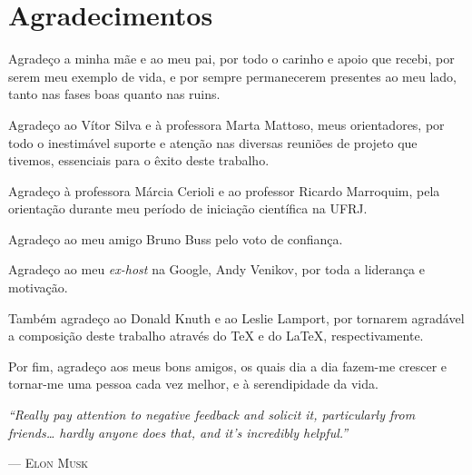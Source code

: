 
\dedication{Dedico este trabalho aos meus pais.}

\chapter*{Agradecimentos}

Agradeço a minha mãe e ao meu pai, por todo o carinho e apoio que recebi, por serem meu exemplo de vida, e por sempre permanecerem presentes ao meu lado, tanto nas fases boas quanto nas ruins.

Agradeço ao Vítor Silva e à professora Marta Mattoso, meus orientadores, por todo o inestimável suporte e atenção nas diversas reuniões de projeto que tivemos, essenciais para o êxito deste trabalho.

Agradeço à professora Márcia Cerioli e ao professor Ricardo Marroquim, pela orientação durante meu período de iniciação científica na UFRJ.

Agradeço ao meu amigo Bruno Buss pelo voto de confiança.

Agradeço ao meu \textit{ex-host} na Google, Andy Venikov, por toda a liderança e motivação.

Também agradeço ao Donald Knuth e ao Leslie Lamport, por tornarem agradável a composição deste trabalho através do \TeX{} e do \LaTeX{}, respectivamente.

Por fim, agradeço aos meus bons amigos, os quais dia a dia fazem-me crescer e tornar-me uma pessoa cada vez melhor, e à serendipidade da vida.

\begin{center}
\end{center}

\vfill{}

\epigraph{\textit{``Really pay attention to negative feedback and solicit it, particularly from friends\ldots{} hardly anyone does that, and it's incredibly helpful.''}}{--- \textsc{Elon Musk}}
